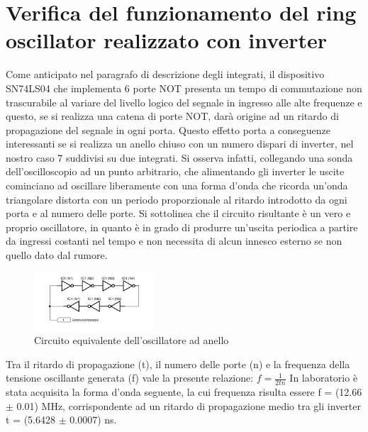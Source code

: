 \documentclass[journal]{IEEEtran}
\begin{document}
\section{Verifica del funzionamento del ring oscillator realizzato con inverter}
Come anticipato nel paragrafo di descrizione degli integrati, il dispositivo SN74LS04 che implementa 6 porte NOT presenta un tempo di commutazione non trascurabile al variare del livello logico del segnale in ingresso alle alte frequenze e questo, se si realizza una catena di porte NOT, darà origine ad un ritardo di propagazione del segnale in ogni porta. 
Questo effetto porta a conseguenze interessanti se si realizza un anello chiuso con un numero dispari di inverter, nel nostro caso 7 suddivisi su due integrati. Si osserva infatti, collegando una sonda dell'oscilloscopio ad un punto arbitrario, che alimentando gli inverter le uscite cominciano ad oscillare liberamente con una forma d'onda che ricorda un'onda triangolare distorta con un periodo proporzionale al ritardo introdotto da ogni porta e al numero delle porte. Si sottolinea che il circuito risultante è un vero e proprio oscillatore, in quanto è in grado di produrre un'uscita periodica a partire da ingressi costanti nel tempo e non necessita di alcun innesco esterno se non quello dato dal rumore.

\begin{figure}[H]%
\begin{center}
\includegraphics[width=0.40\textwidth]{sch-simulations/digital/output/ring-osc-logic.pdf}
\caption{Circuito equivalente dell'oscillatore ad anello}
\label{fig:circuit_ring_oscillator}
\end{center}
\end{figure}

Tra il ritardo di propagazione (t), il numero delle porte (n) e la frequenza della tensione oscillante generata (f) vale la presente relazione: 
\begin{math}
f = \frac{1}{2tn}
\end{math}
In laboratorio è stata acquisita la forma d'onda seguente, la cui frequenza risulta essere f = (12.66 $\pm$ 0.01) MHz, corrispondente ad un ritardo di propagazione medio tra gli inverter t = (5.6428 $\pm$ 0.0007) ns.
\end{document}
